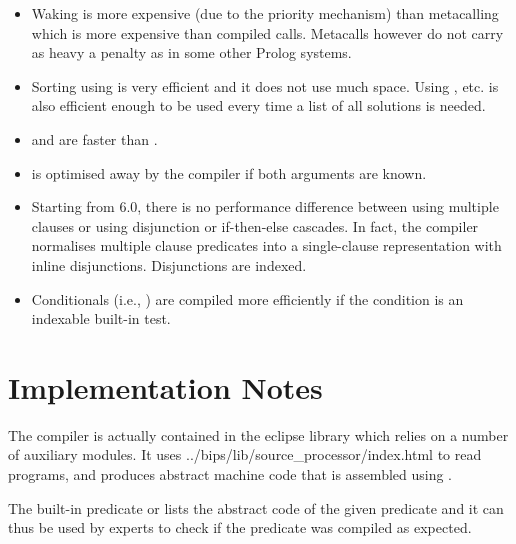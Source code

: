 \begin{itemize}
\item Waking is more expensive (due to the priority mechanism) than metacalling
which is more expensive than compiled calls.
Metacalls however do not carry as heavy a penalty as in
some other Prolog systems.

\item Sorting using  is very
  efficient and it does not use
much space.
Using ,
 etc. is also efficient
enough
to be used every time a list of all solutions is needed.


\item {} and
are faster than
.

\item {} is optimised away
  by the compiler
if both arguments are known.

\item Starting from {\eclipse} 6.0, there is no performance difference between
using multiple clauses or using disjunction or if-then-else cascades.
In fact, the compiler normalises multiple clause predicates into
a single-clause representation with inline disjunctions.
Disjunctions are indexed.

\item Conditionals
(i.e., \notation{$\ldots$->$\ldots$;$\ldots$}) are compiled
more efficiently if the condition is an indexable built-in test.

\end{itemize}


\section{Implementation Notes}

The {\eclipse} compiler is actually contained in the eclipse library
 which relies on a number of auxiliary modules.
It uses
%
{../bips/lib/source_processor/index.html}
to read programs, and produces abstract
machine code that is assembled using
.

The built-in predicate 
or 
lists the abstract code of the given predicate and it can thus be used by
experts
to check if the predicate was compiled as expected.









